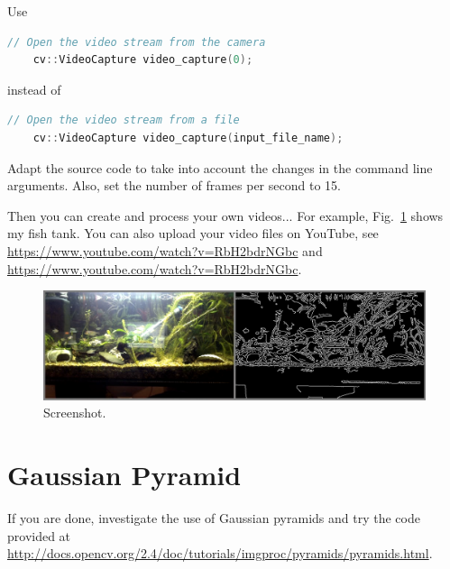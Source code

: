 \documentclass[english,a4paper,12pt,oneside]{article}
\begin{document}
Use 
\begin{lstlisting}[language=c++]
	// Open the video stream from the camera
	cv::VideoCapture video_capture(0);
\end{lstlisting}
instead of 
\begin{lstlisting}[language=c++]
	// Open the video stream from a file
	cv::VideoCapture video_capture(input_file_name);
\end{lstlisting}

Adapt the source code to take into account the changes in the command line arguments.
Also, set the number of frames per second to 15. 

Then you can create and process your own videos...
For example, Fig.~\ref{fig:screenshot2} shows my fish tank. You can also upload your video files on YouTube, see \url{https://www.youtube.com/watch?v=RbH2bdrNGbc} and \url{https://www.youtube.com/watch?v=RbH2bdrNGbc}.

 \begin{figure}[htbp]
  \centering
  \includegraphics[width=\linewidth]{screenshot2}
  \caption{\label{fig:screenshot2}Screenshot.}
 \end{figure}



\section{Gaussian Pyramid}

If you are done, investigate the use of Gaussian pyramids and try the code provided at 
 \url{http://docs.opencv.org/2.4/doc/tutorials/imgproc/pyramids/pyramids.html}. 



\end{document}
